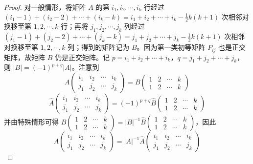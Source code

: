 \documentclass[../../main.tex]{subfiles}
\begin{document}
\begin{proof}
对一般情形，将矩阵 \(A\) 的第 \(i_1,i_2,\cdots,i_k\) 行经过 \((i_1 - 1)+(i_2 - 2)+\cdots+(i_k - k)=i_1 + i_2 + \cdots + i_k - \frac{1}{2}k(k + 1)\) 次相邻对换移至第 \(1,2,\cdots,k\) 行；再将 \(j_1,j_2,\cdots,j_k\) 列经过 \((j_1 - 1)+(j_2 - 2)+\cdots+(j_k - k)=j_1 + j_2 + \cdots + j_k - \frac{1}{2}k(k + 1)\) 次相邻对换移至第 \(1,2,\cdots,k\) 列；得到的矩阵记为 \(B\)。因为第一类初等矩阵 \(P_{ij}\) 也是正交矩阵，故矩阵 \(B\) 仍是正交矩阵。记 \(p = i_1 + i_2 + \cdots + i_k\)，\(q = j_1 + j_2 + \cdots + j_k\)，则 \(\vert B\vert = (-1)^{p + q}\vert A\vert\)。注意到
\[A\begin{pmatrix}
i_1 & i_2 & \cdots & i_k \\
j_1 & j_2 & \cdots & j_k
\end{pmatrix} = B\begin{pmatrix}
1 & 2 & \cdots & k \\
1 & 2 & \cdots & k
\end{pmatrix}\]
\[\widehat{A}\begin{pmatrix}
i_1 & i_2 & \cdots & i_k \\
j_1 & j_2 & \cdots & j_k
\end{pmatrix} = (-1)^{p + q}\widehat{B}\begin{pmatrix}
1 & 2 & \cdots & k \\
1 & 2 & \cdots & k
\end{pmatrix}\]
并由特殊情形可得 \(B\begin{pmatrix}
1 & 2 & \cdots & k \\
1 & 2 & \cdots & k
\end{pmatrix} = \vert B\vert^{-1}\widehat{B}\begin{pmatrix}
1 & 2 & \cdots & k \\
1 & 2 & \cdots & k
\end{pmatrix}\)，因此
\[A\begin{pmatrix}
i_1 & i_2 & \cdots & i_k \\
j_1 & j_2 & \cdots & j_k
\end{pmatrix} = \vert A\vert^{-1}\widehat{A}\begin{pmatrix}
i_1 & i_2 & \cdots & i_k \\
j_1 & j_2 & \cdots & j_k
\end{pmatrix}\] 
\end{proof}
\end{document}
